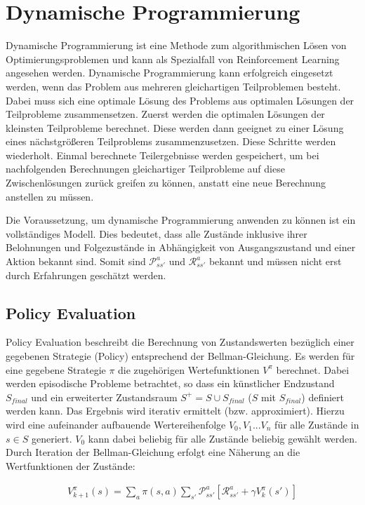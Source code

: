 \documentclass[10pt]{scrartcl}
\begin{document}
\section{Dynamische Programmierung}

Dynamische Programmierung ist eine Methode zum algorithmischen Lösen von Optimierungsproblemen und kann als Spezialfall von Reinforcement Learning angesehen werden. Dynamische Programmierung kann erfolgreich eingesetzt werden, wenn das Problem aus mehreren gleichartigen Teilproblemen besteht. Dabei muss sich eine optimale Lösung des Problems aus optimalen Lösungen der Teilprobleme zusammensetzen. Zuerst werden die optimalen Lösungen der kleinsten Teilprobleme berechnet. Diese werden dann geeignet zu einer Lösung eines nächstgrößeren Teilproblems zusammenzusetzen. Diese Schritte werden wiederholt. Einmal berechnete Teilergebnisse werden gespeichert, um bei nachfolgenden Berechnungen gleichartiger Teilprobleme auf diese Zwischenlösungen zurück greifen zu können, anstatt eine neue Berechnung anstellen zu müssen. 

Die Voraussetzung, um dynamische Programmierung anwenden zu können ist ein vollständiges Modell. Dies bedeutet, dass alle Zustände inklusive ihrer Belohnungen und Folgezustände in Abhängigkeit von Ausgangszustand und einer Aktion bekannt sind.
Somit sind $\mathcal{P}^{a}_{ss'}$ und $\mathcal{R}^{a}_{ss'}$ bekannt und müssen nicht erst durch Erfahrungen geschätzt werden.

\subsection{Policy Evaluation}
Policy Evaluation beschreibt die Berechnung von Zustandswerten bezüglich einer gegebenen Strategie (Policy) entsprechend der Bellman-Gleichung. Es werden für eine gegebene Strategie $\pi$ die zugehörigen Wertefunktionen $V^{\pi}$ berechnet. Dabei werden episodische Probleme betrachtet, so dass ein künstlicher Endzustand $S_{final}$  und ein erweiterter Zustandsraum $S^+=S\cup{S_{final}}$ ($S$ mit $S_{final}$) definiert werden kann. Das Ergebnis wird iterativ ermittelt (bzw. approximiert). Hierzu wird eine aufeinander aufbauende Wertereihenfolge $V_0, V_1 ... V_n$ für alle Zustände in $s \in S$ generiert. $V_0$ kann dabei beliebig für alle Zustände beliebig gewählt werden. Durch Iteration der Bellman-Gleichung erfolgt eine Näherung an die Wertfunktionen der Zustände:

\begin{align*}
V^\pi_{k+1}(s) = \sum\limits_{a} \pi(s,a) \sum\limits_{s'}\mathcal{P}^a_{ss'}[\mathcal{R}^a_{ss'}+\gamma V^\pi_k(s')]
\end{align*}
\end{document}
